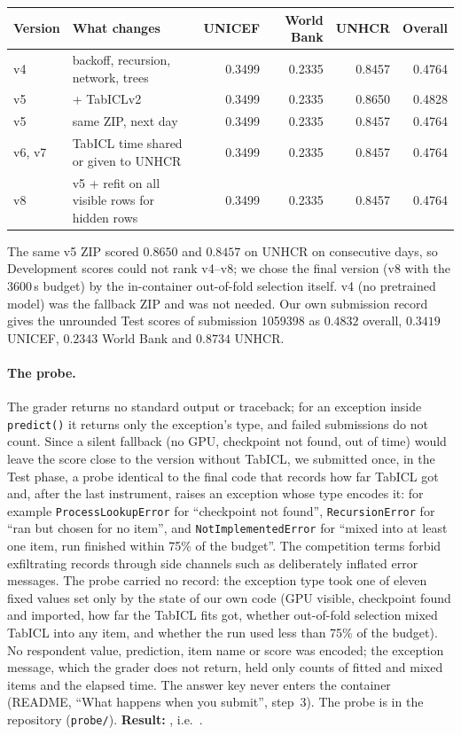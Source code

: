 \documentclass{article}
\begin{document}
\begin{center}\small
\begin{tabular}{@{}llrrrr@{}}
\toprule
Version & What changes & UNICEF & World Bank & UNHCR & Overall\\
\midrule
v4 & backoff, recursion, network, trees & 0.3499 & 0.2335 & 0.8457 & 0.4764\\
v5 & + TabICLv2 & 0.3499 & 0.2335 & 0.8650 & 0.4828\\
v5 & same ZIP, next day & 0.3499 & 0.2335 & 0.8457 & 0.4764\\
v6, v7 & TabICL time shared or given to UNHCR & 0.3499 & 0.2335 & 0.8457 & 0.4764\\
v8 & v5 + refit on all visible rows for hidden rows & 0.3499 & 0.2335 & 0.8457 & 0.4764\\
\bottomrule
\end{tabular}
\end{center}

\noindent The same v5 ZIP scored $0.8650$ and $0.8457$ on UNHCR on consecutive
days, so Development scores could not rank v4--v8; we chose the final version
(v8 with the 3600\,s budget) by the in-container out-of-fold selection itself.
v4 (no pretrained model) was the fallback ZIP and was not needed. Our own
submission record gives the unrounded Test scores of submission 1059398 as
$0.4832$ overall, $0.3419$ UNICEF, $0.2343$ World Bank and $0.8734$ UNHCR.

\paragraph{The probe.}
\label{app:probe}
The grader returns no standard output or traceback; for an exception inside
\texttt{predict()} it returns only the exception's type, and failed submissions
do not count. Since a silent fallback (no GPU, checkpoint not found, out of
time) would leave the score close to the version without TabICL, we submitted
once, in the Test phase, a probe identical to the final code that records how
far TabICL got and, after the last instrument, raises an exception whose type
encodes it: for example \texttt{ProcessLookupError} for ``checkpoint not
found'', \texttt{RecursionError} for ``ran but chosen for no item'', and
\texttt{NotImplementedError} for ``mixed into at least one item, run finished
within 75\% of the budget''. The competition terms forbid exfiltrating records
through side channels such as deliberately inflated error messages. The probe
carried no record: the exception type took one of eleven fixed values set only
by the state of our own code (GPU visible, checkpoint found and imported, how
far the TabICL fits got, whether out-of-fold selection mixed TabICL into any
item, and whether the run used less than 75\% of the budget). No respondent
value, prediction, item name or score was encoded; the exception message, which
the grader does not return, held only counts of fitted and mixed items and the
elapsed time. The answer key never enters the container (README, ``What happens
when you submit'', step~3). The probe is in the repository (\texttt{probe/}).
\textbf{Result:} \texttt{\ProbeType}, i.e.\ \ProbeMeaning.
\end{document}
